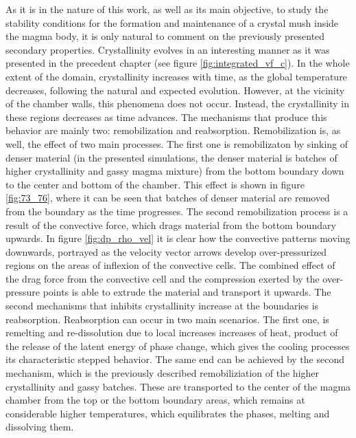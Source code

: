 As it is in the nature of this work, as well as its main objective, to study the stability conditions for the formation and maintenance of a crystal mush inside the magma body, it is only natural to comment on the previously presented secondary properties. Crystallinity evolves in an interesting manner as it was presented in the precedent chapter (see figure \ref{fig:integrated_vf_c}). In the whole extent of the domain, crystallinity increases with time, as the global temperature decreases, following the natural and expected evolution. However, at the vicinity of the chamber walls, this phenomena does not occur. Instead, the crystallinity in these regions decreases as time advances. The mechanisms that produce this behavior are mainly two: remobilization and reabsorption. Remobilization is, as well, the effect of two main processes. The first one is remobilizaton by sinking of denser material (in the presented simulations, the denser material is batches of higher crystallinity and gassy magma mixture) from the bottom boundary down to the center and bottom of the chamber. This effect is shown in figure \ref{fig:73_76}, where it can be seen that batches of denser material are removed from the boundary as the time progresses. The second remobilization process is a result of the convective force, which drags material from the bottom boundary upwards. In figure \ref{fig:dp_rho_vel} it is clear how the convective patterns moving downwards, portrayed as the velocity vector arrows develop over-pressurized regions on the areas of inflexion of the convective cells. The combined effect of the drag force from the convective cell and the compression exerted by the over-pressure points is able to extrude the material and transport it upwards. The second mechanisms that inhibits crystallinity increase at the boundaries is reabsorption. Reabsorption can occur in two main scenarios. The first one, is remelting and re-dissolution due to local increases increases of heat, product of the release of the latent energy of phase change, which gives the cooling processes its characteristic stepped behavior. The same end can be achieved by the second mechanism, which is the previously described remobiliziation of the higher crystallinity and gassy batches. These are transported to the center of the magma chamber from the top or the bottom boundary areas, which remains at considerable higher temperatures, which equilibrates the phases, melting and dissolving them. 

